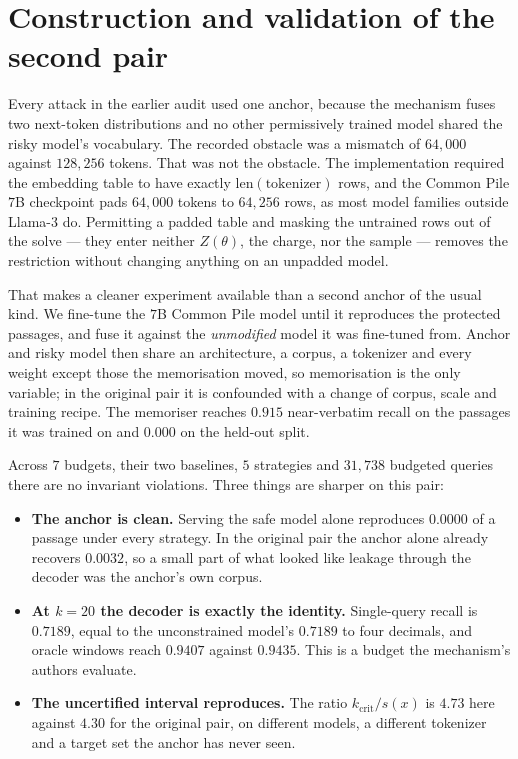 \section{Construction and validation of the second pair}\label{app:second-anchor}

Every attack in the earlier audit used one anchor, because the mechanism fuses two next-token
distributions and no other permissively trained model shared the risky model's vocabulary. The
recorded obstacle was a mismatch of $64{,}000$ against $128{,}256$ tokens. That was not the
obstacle. The implementation required the embedding table to have exactly
$\mathrm{len}(\text{tokenizer})$ rows, and the Common Pile $7$B checkpoint pads $64{,}000$ tokens to
$64{,}256$ rows, as most model families outside Llama-3 do. Permitting a padded table and masking
the untrained rows out of the solve --- they enter neither $Z(\theta)$, the charge, nor the sample
--- removes the restriction without changing anything on an unpadded model.

That makes a cleaner experiment available than a second anchor of the usual kind. We fine-tune the
$7$B Common Pile model until it reproduces the protected passages, and fuse it against the
\emph{unmodified} model it was fine-tuned from. Anchor and risky model then share an architecture,
a corpus, a tokenizer and every weight except those the memorisation moved, so memorisation is the
only variable; in the original pair it is confounded with a change of corpus, scale and training
recipe. The memoriser reaches $0.915$ near-verbatim recall on the passages it was trained on and
$0.000$ on the held-out split.

Across $7$ budgets, their two baselines, $5$ strategies and $31{,}738$ budgeted queries there are no invariant
violations. Three things are sharper on this pair:

\begin{itemize}
\item \textbf{The anchor is clean.} Serving the safe model alone reproduces $0.0000$ of a passage
      under every strategy. In the original pair the anchor alone already recovers $0.0032$, so a
      small part of what looked like leakage through the decoder was the anchor's own corpus.
\item \textbf{At $k=20$ the decoder is exactly the identity.} Single-query recall is $0.7189$,
      equal to the unconstrained model's $0.7189$ to four decimals, and oracle windows reach
      $0.9407$ against $0.9435$. This is a budget the mechanism's authors evaluate.
\item \textbf{The uncertified interval reproduces.} The ratio $k_{\mathrm{crit}}/s(x)$ is $4.73$
      here against $4.30$ for the original pair, on different models, a different tokenizer and a
      target set the anchor has never seen.
\end{itemize}

